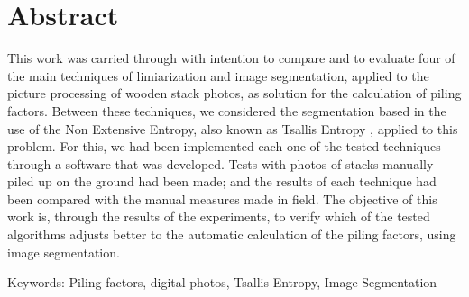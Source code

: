 

\chapter*{Abstract}

This work was carried through with intention to compare and to evaluate four of the main techniques of limiarization and image segmentation, applied to the picture processing of wooden stack photos, as solution for the calculation of piling factors.  Between these techniques, we considered the segmentation based in the use of the Non Extensive Entropy, also known as Tsallis Entropy \cite{Tsallis_1988,Tsallis_1999,Tsallis_2001}, applied to this problem.  For this, we had been implemented each one of the tested techniques through a software that was developed.  Tests with photos of stacks manually piled up on the ground had been made; and the results of each technique had been compared with the manual measures  made in field.  The objective of this work is, through the results of the experiments, to verify which of the tested algorithms adjusts better to the automatic calculation of the piling factors, using image segmentation.


\vspace{0.5cm}
Keywords:  Piling factors, digital photos, Tsallis Entropy, Image Segmentation 
